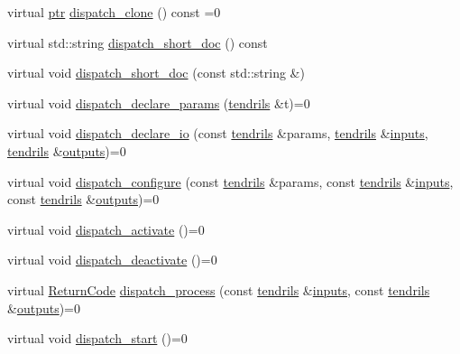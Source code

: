 \begin{DoxyCompactItemize}
\item 
virtual \hyperlink{structecto_1_1cell_af2cab9d2bc012088c4f58c40da57a862}{ptr} \hyperlink{structecto_1_1cell_a7beccd749c33bd8b4c5827598e8fe5a5}{dispatch\-\_\-clone} () const =0
\item 
virtual std\-::string \hyperlink{structecto_1_1cell_a400b8aecf15588cfb21d712fbb000e8a}{dispatch\-\_\-short\-\_\-doc} () const 
\item 
virtual void \hyperlink{structecto_1_1cell_a407d24db843ffe12ac57c9a8827a9fe8}{dispatch\-\_\-short\-\_\-doc} (const std\-::string \&)
\item 
virtual void \hyperlink{structecto_1_1cell_abcf3cc29703214a7ede63d652e17ee96}{dispatch\-\_\-declare\-\_\-params} (\hyperlink{classecto_1_1tendrils}{tendrils} \&t)=0
\item 
virtual void \hyperlink{structecto_1_1cell_acb4cdb70f2db329ba9c615d74c63a4b2}{dispatch\-\_\-declare\-\_\-io} (const \hyperlink{classecto_1_1tendrils}{tendrils} \&params, \hyperlink{classecto_1_1tendrils}{tendrils} \&\hyperlink{structecto_1_1cell_a65099b0458a7761b8bfa7a1ddc17e92f}{inputs}, \hyperlink{classecto_1_1tendrils}{tendrils} \&\hyperlink{structecto_1_1cell_a93951743b603faba35312ebdb07ceb22}{outputs})=0
\item 
virtual void \hyperlink{structecto_1_1cell_a19c7c679dededd37ace918bf0ff31cd3}{dispatch\-\_\-configure} (const \hyperlink{classecto_1_1tendrils}{tendrils} \&params, const \hyperlink{classecto_1_1tendrils}{tendrils} \&\hyperlink{structecto_1_1cell_a65099b0458a7761b8bfa7a1ddc17e92f}{inputs}, const \hyperlink{classecto_1_1tendrils}{tendrils} \&\hyperlink{structecto_1_1cell_a93951743b603faba35312ebdb07ceb22}{outputs})=0
\item 
virtual void \hyperlink{structecto_1_1cell_aa345ec700e5e213364c7bb20571cd78d}{dispatch\-\_\-activate} ()=0
\item 
virtual void \hyperlink{structecto_1_1cell_a4b5f111fc7b90dccce0cd70e28c9be62}{dispatch\-\_\-deactivate} ()=0
\item 
virtual \hyperlink{namespaceecto_a93d82cd28db695d53963fb696582762c}{Return\-Code} \hyperlink{structecto_1_1cell_a390bd83cfdff120523efc5c3e76bc3e5}{dispatch\-\_\-process} (const \hyperlink{classecto_1_1tendrils}{tendrils} \&\hyperlink{structecto_1_1cell_a65099b0458a7761b8bfa7a1ddc17e92f}{inputs}, const \hyperlink{classecto_1_1tendrils}{tendrils} \&\hyperlink{structecto_1_1cell_a93951743b603faba35312ebdb07ceb22}{outputs})=0
\item 
virtual void \hyperlink{structecto_1_1cell_ab5c75358dd32fa811116654bdc76385b}{dispatch\-\_\-start} ()=0

\end{DoxyCompactItemize}

